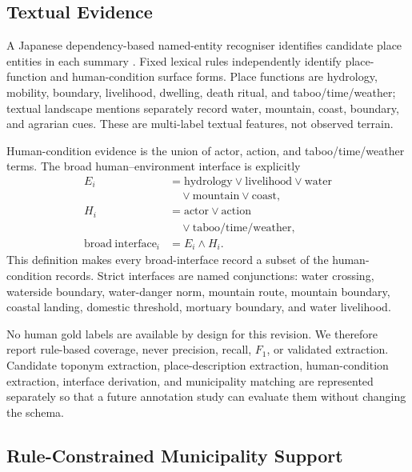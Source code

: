 \documentclass{isprs}
\begin{document}
\subsection{Textual Evidence}

A Japanese dependency-based named-entity recogniser identifies candidate place entities in each summary \cite{matsuda2020}. Fixed lexical rules independently identify place-function and human-condition surface forms. Place functions are hydrology, mobility, boundary, livelihood, dwelling, death ritual, and taboo/time/weather; textual landscape mentions separately record water, mountain, coast, boundary, and agrarian cues. These are multi-label textual features, not observed terrain.

Human-condition evidence is the union of actor, action, and taboo/time/weather terms. The broad human--environment interface is explicitly
\begin{equation}
\begin{aligned}
E_i &= \mathrm{hydrology}\lor\mathrm{livelihood}\lor\mathrm{water}\\
    &\quad\lor\mathrm{mountain}\lor\mathrm{coast},\\
H_i &= \mathrm{actor}\lor\mathrm{action}\\
    &\quad\lor\mathrm{taboo/time/weather},\\
\mathrm{broad\ interface}_i &= E_i\land H_i .
\end{aligned}
\label{eq:interface}
\end{equation}
This definition makes every broad-interface record a subset of the human-condition records. Strict interfaces are named conjunctions: water crossing, waterside boundary, water-danger norm, mountain route, mountain boundary, coastal landing, domestic threshold, mortuary boundary, and water livelihood.

No human gold labels are available by design for this revision. We therefore report rule-based coverage, never precision, recall, \(F_1\), or validated extraction. Candidate toponym extraction, place-description extraction, human-condition extraction, interface derivation, and municipality matching are represented separately so that a future annotation study can evaluate them without changing the schema.

\subsection{Rule-Constrained Municipality Support}
\end{document}
